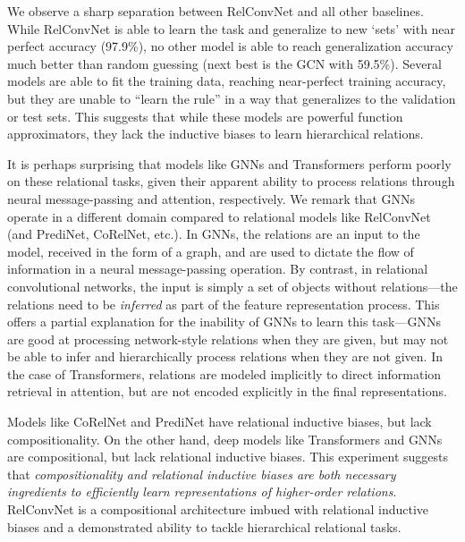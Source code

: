 We observe a sharp separation between RelConvNet and all other baselines. While RelConvNet is able to learn the task and generalize to new `sets' with near perfect accuracy (97.9\%), no other model is able to reach generalization accuracy much better than random guessing (next best is the GCN with 59.5\%). Several models are able to fit the training data, reaching near-perfect training accuracy, but they are unable to ``learn the rule'' in a way that generalizes to the validation or test sets. This suggests that while these models are powerful function approximators, they lack the inductive biases to learn hierarchical relations.

It is perhaps surprising that models like GNNs and Transformers perform poorly on these relational tasks, given their apparent ability to process relations through neural message-passing and attention, respectively. We remark that GNNs operate in a different domain compared to relational models like RelConvNet (and PrediNet, CoRelNet, etc.). In GNNs, the relations are an input to the model, received in the form of a graph, and are used to dictate the flow of information in a neural message-passing operation. By contrast, in relational convolutional networks, the input is simply a set of objects without relations---the relations need to be \textit{inferred} as part of the feature representation process. 
This offers a partial explanation for the inability of GNNs to learn this task---GNNs are good at processing network-style relations when they are given, but may not be able to infer and hierarchically process relations when they are not given. In the case of Transformers, relations are modeled implicitly to direct information retrieval in attention, but are not encoded explicitly in the final representations.

Models like CoRelNet and PrediNet have relational inductive biases, but lack compositionality. On the other hand, deep models like Transformers and GNNs are compositional, but lack relational inductive biases. This experiment suggests that \textit{compositionality and relational inductive biases are both necessary ingredients to efficiently learn representations of higher-order relations}. RelConvNet is a compositional architecture imbued with relational inductive biases and a demonstrated ability to tackle hierarchical relational tasks.